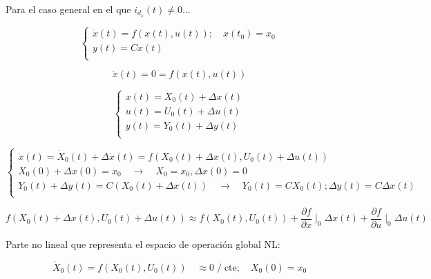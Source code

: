\documentclass{article}
\begin{document}
Para el caso general en el que ${i}_{d_{s}}(t) \neq 0$... 

\begin{equation}
    \begin{cases}
        \dot{x}(t) = f(x(t),u(t));  \quad   x(t_{0}) = x_{0}\\
        y(t) = Cx(t)\\
    \end{cases}
\end{equation}


\begin{equation}
    \dot{x}(t) = 0 = f(x(t),u(t))
\end{equation}


\begin{equation}
    \begin{cases}
        x(t) = X_{0}(t) + \Delta x(t)\\
        u(t) = U_{0}(t) + \Delta u(t)\\
        y(t) = Y_{0}(t) + \Delta y(t)\\
    \end{cases}
\end{equation}


\begin{equation}
    \begin{cases}
        \dot{x}(t) = \dot{X}_{0}(t) + \Delta\dot{x}(t) = f(X_{0}(t) + \Delta x(t), U_{0}(t) + \Delta u(t))\\
        X_{0}(0) + \Delta x(0) = x_{0} \quad\rightarrow\quad X_{0} = x_{0}, \Delta x(0) = 0 \\
        Y_{0}(t) + \Delta y(t) = C(X_{0}(t) + \Delta x(t)) \quad\rightarrow\quad Y_{0}(t) = C X_{0}(t); \Delta y(t) = C \Delta x(t)\\
    \end{cases}
\end{equation}


\begin{equation}
    f(X_{0}(t) + \Delta x(t), U_{0}(t) + \Delta u (t)) \approx f(X_{0}(t), U_{0}(t)) + \frac{\partial f}{\partial x}\mid_{0}\Delta x(t) + \frac{\partial f}{\partial u}\mid_{0}\Delta u(t)
\end{equation}

Parte no lineal que representa el espacio de operación global NL:

\begin{equation}
    \dot{X}_{0}(t) = f(X_{0}(t), U_{0}(t)) \quad \approx 0 \;/\; \text{cte}; \quad X_{0}(0) = x_{0}
\end{equation}
\end{document}
